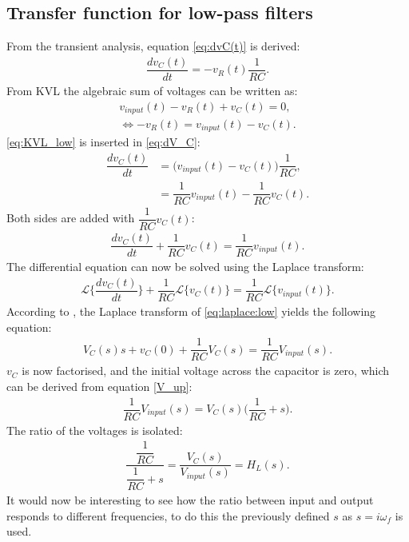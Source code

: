 \subsection{Transfer function for low-pass filters}
From the transient analysis, equation \eqref{eq:dvC(t)} is derived:
\begin{align} \label{eq:dV_C}
\dfrac{dv_C(t)}{dt}=-v_R(t)\dfrac{1}{RC}.
\end{align}
From KVL the algebraic sum of voltages can be written as: 
\begin{align}
v_{input}(t)-v_{R}(t)+v_{C}(t)=0,\nonumber
\\
\Leftrightarrow -v_{R}(t) = v_{input}(t) - v_{C}(t). \label{eq:KVL_low}
\end{align}
\eqref{eq:KVL_low} is inserted in \eqref{eq:dV_C}:
\begin{align*} 
\dfrac{dv_C(t)}{dt}&=\Big(v_{input}(t) - v_{C}(t)\Big)\dfrac{1}{RC},
\\
&=\dfrac{1}{RC}v_{input}(t) - \dfrac{1}{RC}v_{C}(t).
\end{align*}
Both sides are added with $\dfrac{1}{RC}v_C(t)$:
\begin{align*}
\dfrac{dv_C(t)}{dt}+\dfrac{1}{RC}v_C(t)=\dfrac{1}{RC}v_{input}(t).
\end{align*}
The differential equation can now be solved using the Laplace transform:
\begin{align}\label{eq:laplace:low}\mathcal{L}\bigg\{\dfrac{dv_C(t)}{dt}\bigg\}+\dfrac{1}{RC}\mathcal{L}\Big\{v_C(t)\Big\}=\dfrac{1}{RC}\mathcal{L}\Big\{v_{input}(t)\Big\}.
\end{align}
According to , the Laplace transform of \eqref{eq:laplace:low} yields the following equation:
\begin{align*}
V_C(s)s+v_C(0)+\dfrac{1}{RC}V_C(s)=\dfrac{1}{RC}V_{input}(s).
\end{align*} 
$v_{C}$ is now factorised, and the initial voltage across the capacitor is zero, which can be derived from equation \eqref{V_up}:
\begin{align*}
\dfrac{1}{RC}V_{input}(s)=V_{C}(s)\Big(\dfrac{1}{RC}+s\Big).
\end{align*} 
The ratio of the voltages is isolated:
\begin{align*}
\dfrac{\dfrac{1}{RC}}{\dfrac{1}{RC}+s} = \dfrac{V_{C}(s)}{V_{input}(s)}=H_L(s).
\end{align*}
It would now be interesting to see how the ratio between input and output responds to different frequencies, to do this the previously defined $s$ as $s=i\omega_f$ is used.

